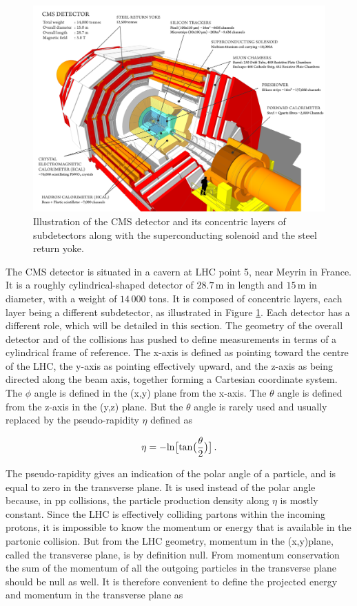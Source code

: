\begin{figure}
    \centering
    \includegraphics[width=\textwidth]{Images/CMS_subdetectors.png}
    \caption{Illustration of the CMS detector and its concentric layers of subdetectors along with the superconducting solenoid and the steel return yoke.}
    \label{fig:CMS_subdetectors}
\end{figure}

The CMS detector is situated in a cavern at LHC point 5, near Meyrin in France. It is a roughly cylindrical-shaped detector of $28.7\,\mathrm{m}$ in length and $15\,\mathrm{m}$ in diameter, with a weight of $14\,000$ tons. It is composed of concentric layers, each layer being a different subdetector, as illustrated in Figure \ref{fig:CMS_subdetectors}. Each detector has a different role, which will be detailed in this section. The geometry of the overall detector and of the collisions has pushed to define measurements in terms of a cylindrical frame of reference. The x-axis is defined as pointing toward the centre of the LHC, the y-axis as pointing effectively upward, and the z-axis as being directed along the beam axis, together forming a Cartesian coordinate system. The $\phi$ angle is defined in the (x,y) plane from the x-axis. The $\theta$ angle is defined from the z-axis in the (y,z) plane. But the $\theta$ angle is rarely used and usually replaced by the pseudo-rapidity $\eta$ defined as

\begin{equation}
    \eta = - \mathrm{ln} \big[ \mathrm{tan} \big(\frac{\theta}{2}\big)\big] \mend
\end{equation}

The pseudo-rapidity gives an indication of the polar angle of a particle, and is equal to zero in the transverse plane. It is used instead of the polar angle because, in pp collisions, the particle production density along $\eta$ is mostly constant. Since the LHC is effectively colliding partons within the incoming protons, it is impossible to know the momentum or energy that is available in the partonic collision. But from the LHC geometry, momentum in the (x,y)plane, called the transverse plane, is by definition null. From momentum conservation the sum of the momentum of all the outgoing particles in the transverse plane should be null as well. It is therefore convenient to define the projected energy and momentum in the transverse plane as

